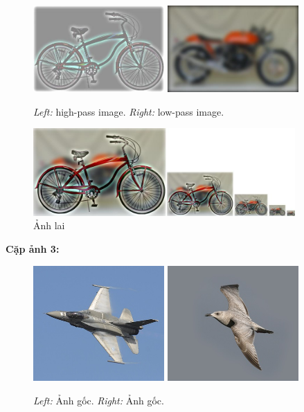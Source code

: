 \begin{figure}[H]
    \centering
    \includegraphics[width=5cm]{images/results_part2/motorcycle_bicycle/high_frequencies.jpg}
    \includegraphics[width=5cm]{images/results_part2/motorcycle_bicycle/low_frequencies.jpg}
    \caption{\emph{Left:} high-pass image. \emph{Right:} low-pass image.}
\end{figure}
\begin{figure}[H]
    \centering
    \includegraphics[width=10cm]{images/results_part2/motorcycle_bicycle/hybrid_image_scales.jpg}
    \caption{Ảnh lai}
\end{figure}

\textbf{Cặp ảnh 3:}
\begin{figure}[H]
    \centering
    \includegraphics[width=5cm]{images/results_part2/bird_plane/03_plane.jpg}
    \includegraphics[width=5cm]{images/results_part2/bird_plane/03_bird.jpg}
    \caption{\emph{Left:} Ảnh gốc. \emph{Right:} Ảnh gốc.}
\end{figure}

